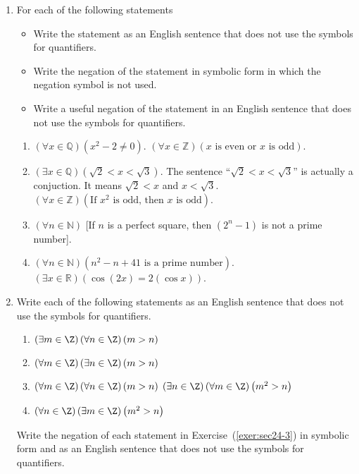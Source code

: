 \begin{enumerate}
\item For each of the following statements
\label{exer:sec24-2}%
  \begin{itemize}
    \item Write the statement as an English sentence that does not use the symbols for quantifiers.
    \item Write the negation of the statement in symbolic form in which the negation symbol is not used.
    \item Write a useful negation of the statement in an English sentence that does not use the symbols for quantifiers.
  \end{itemize}
%
  \begin{enumerate}
    \yitem $\left( {\exists x \in \mathbb{Q}} \right)\left( {x > \sqrt 2 } \right)$.
    \item $\left( {\forall x \in \mathbb{Q}} \right)\left( {x^2  - 2 \ne 0} \right)$.
    \yitem $\left( {\forall x \in \mathbb{Z}} \right)\left( {x\text{ is even  or  }x\text{ is odd}} \right)$.
   \item $\left( {\exists x \in \mathbb{Q}} \right)\left( {\sqrt 2  < x < \sqrt 3 } \right)$.  \note  The sentence ``$\sqrt 2  < x < \sqrt 3$'' is actually a conjuction.  It means 
$\sqrt 2 < x$ and $x < \sqrt 3$.
   \yitem $\left( {\forall x \in \mathbb{Z}} \right)\left( {\text{If }x^2 \text{ is odd, then }x\text{ is odd}} \right)$.
  \item $\left( {\forall n \in \mathbb{N}} \right)$ [If  $n$ is a perfect square, then 
$\left( {2^n  - 1} \right)$  is not a prime number].
   \item $\left( {\forall n \in \mathbb{N}} \right)\left( {n^2  - n + 41} 
\text{ is a prime number} \right)$.
  \yitem $\left( {\exists x \in \mathbb{R}} \right) \left( {\cos ( {2x} ) = 2( {\cos x} )} \right)$.
 \end{enumerate}
%
\item \label{exer:sec24-3}%
Write each of the following statements as an English sentence that does not use the symbols for quantifiers.
\begin{multicols}{2}
\begin{enumerate}
  \yitem $\left( {\exists m} \in \Z \right)\left( {\exists n} \in \Z \right)\left( {m > n} \right)$
  \item $\left( {\exists m} \in \Z \right)\left( {\forall n} \in \Z \right)\left( {m > n} \right)$
  \item $\left( {\forall m} \in \Z \right)\left( {\exists n} \in \Z \right)\left( {m > n} \right)$
  \item $\left( {\forall m}\in \Z \right)\left( {\forall n} \in \Z \right)\left( {m > n} \right)$
  \yitem $\left( {\exists n} \in \Z \right)\left( {\forall m} \in \Z \right)\left( {m^2  > n} \right)$
  \item $\left( {\forall n} \in \Z \right)\left( {\exists m} \in \Z \right)\left( {m^2  > n} \right)$
\end{enumerate}
\end{multicols}
%
\xitem Write the negation of each statement in Exercise~(\ref{exer:sec24-3}) in symbolic form and as an English sentence that does not use the symbols for quantifiers.
\label{exer:sec24-4}%


\end{enumerate}
